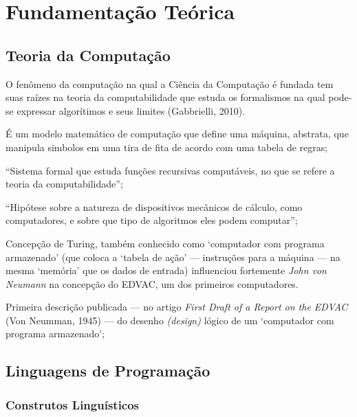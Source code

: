 \section{Fundamentação Teórica}
\label{sec:fund-teor}


\subsection{Teoria da Computação}
\label{sec:teoria-da-computacao}

O fenômeno da computação na qual a Ciência da Computação é fundada tem suas
raízes na teoria da computabilidade que estuda os formalismos na qual pode-se
expressar algorítimos e seus limites (Gabbrielli, 2010).

{\tiny
  \begin{description}[noitemsep]
  \item[Máquina de Turing] É um modelo matemático de computação que define uma
    máquina, abstrata, que manipula simbolos em uma tira de fita de acordo com
    uma tabela de regras;
  \item[Cálculo Lambda] ``Sistema formal que estuda funções recursivas
    computáveis, no que se refere a teoria da computabilidade'';
  \item[Tese de Church-Turing] ``Hipótese sobre a natureza de dispositivos
    mecânicos de cálculo, como computadores, e sobre que tipo de algoritmos eles
    podem computar'';
  \item[Máquina de Turing universal (MTU)] Concepção de Turing, também conhecido
    como `computador com programa armazenado' (que coloca a `tabela de ação' ---
    instruções para a máquina --- na mesma `memória' que os dados de entrada)
    influenciou fortemente \emph{John von Neumann} na concepção do EDVAC, um dos
    primeiros computadores.
  \item[Arquitetura de von Neumman] Primeira descrição publicada --- no artigo
    \emph{First Draft of a Report on the EDVAC} (Von Neumman, 1945) --- do
    desenho \emph{(design)} lógico de um `computador com programa armazenado';
  \end{description}
}


\subsection{Linguagens de Programação}
\label{sec:prog_languages}

\subsubsection{Construtos Linguísticos}
\label{sec:constr-ling}

